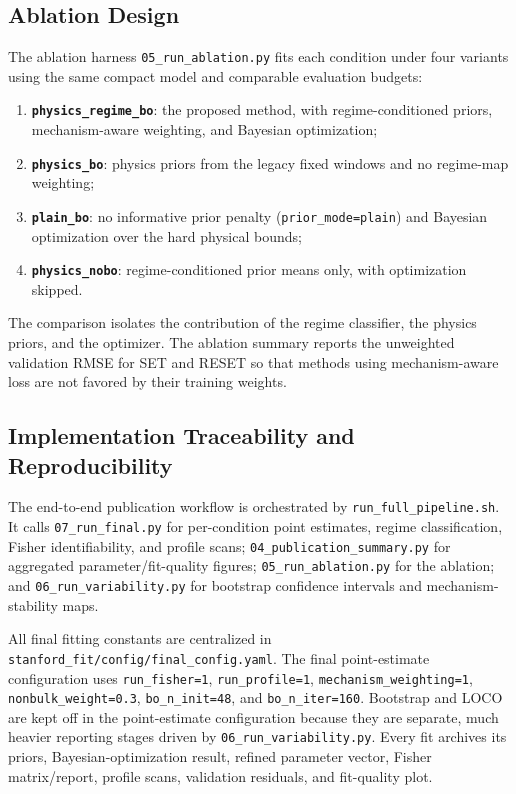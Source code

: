 \documentclass[journal]{IEEEtran}
\begin{document}
\subsection{Ablation Design}
\label{sec:ablation}

The ablation harness \texttt{05\_run\_ablation.py} fits each condition under
four variants using the same compact model and comparable evaluation budgets:
\begin{enumerate}
  \item \textbf{\texttt{physics\_regime\_bo}}: the proposed method, with
        regime-conditioned priors, mechanism-aware weighting, and Bayesian
        optimization;
  \item \textbf{\texttt{physics\_bo}}: physics priors from the legacy fixed
        windows and no regime-map weighting;
  \item \textbf{\texttt{plain\_bo}}: no informative prior penalty
        (\texttt{prior\_mode=plain}) and Bayesian optimization over the hard
        physical bounds;
  \item \textbf{\texttt{physics\_nobo}}: regime-conditioned prior means only,
        with optimization skipped.
\end{enumerate}
The comparison isolates the contribution of the regime classifier, the physics
priors, and the optimizer.  The ablation summary reports the unweighted
validation RMSE for SET and RESET so that methods using mechanism-aware loss
are not favored by their training weights.

\subsection{Implementation Traceability and Reproducibility}
\label{sec:implementation}

The end-to-end publication workflow is orchestrated by
\texttt{run\_full\_pipeline.sh}.  It calls \texttt{07\_run\_final.py} for
per-condition point estimates, regime classification, Fisher identifiability,
and profile scans; \texttt{04\_publication\_summary.py} for aggregated
parameter/fit-quality figures; \texttt{05\_run\_ablation.py} for the ablation;
and \texttt{06\_run\_variability.py} for bootstrap confidence intervals and
mechanism-stability maps.

All final fitting constants are centralized in
\texttt{stanford\_fit/config/final\_config.yaml}.  The final point-estimate
configuration uses \texttt{run\_fisher=1}, \texttt{run\_profile=1},
\texttt{mechanism\_weighting=1}, \texttt{nonbulk\_weight=0.3},
\texttt{bo\_n\_init=48}, and \texttt{bo\_n\_iter=160}.  Bootstrap and LOCO
are kept off in the point-estimate configuration because they are separate,
much heavier reporting stages driven by \texttt{06\_run\_variability.py}.
Every fit archives its priors, Bayesian-optimization result, refined
parameter vector, Fisher matrix/report, profile scans, validation residuals,
and fit-quality plot.
\end{document}
